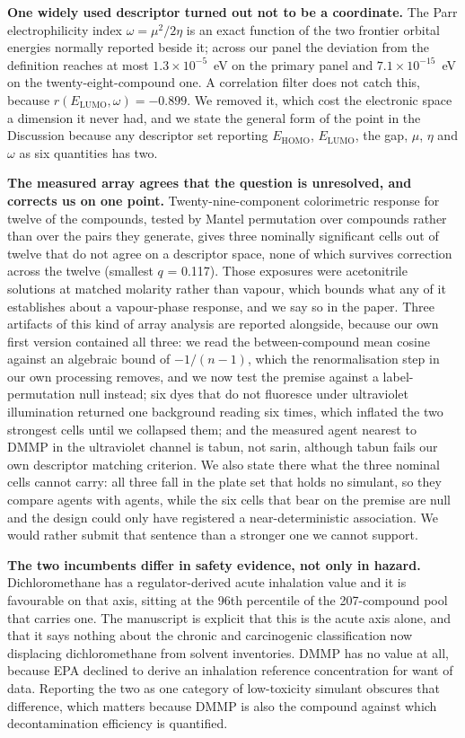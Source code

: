 \documentclass[11pt,a4paper]{article}
\begin{document}
\textbf{One widely used descriptor turned out not to be a coordinate.} The Parr
electrophilicity index $\omega = \mu^{2}/2\eta$ is an exact function of the two
frontier orbital energies normally reported beside it; across our panel the
deviation from the definition reaches at most $1.3\times10^{-5}$~eV on the
primary panel and $7.1\times10^{-15}$~eV on the twenty-eight-compound one. A correlation
filter does not catch this, because $r(E_\mathrm{LUMO}, \omega) = -0.899$. We
removed it, which cost the electronic space a dimension it never had, and we
state the general form of the point in the Discussion because any descriptor set
reporting $E_\mathrm{HOMO}$, $E_\mathrm{LUMO}$, the gap, $\mu$, $\eta$ and
$\omega$ as six quantities has two.

\textbf{The measured array agrees that the question is unresolved, and corrects
us on one point.} Twenty-nine-component colorimetric response for twelve of the
compounds, tested by Mantel permutation over compounds rather than over the
pairs they generate, gives three nominally significant cells out of twelve that
do not agree on a descriptor space, none of which survives correction across
the twelve (smallest $q$ = 0.117). Those exposures were acetonitrile solutions
at matched molarity rather than vapour, which bounds what any of it establishes
about a vapour-phase response, and we say so in the paper. Three artifacts of this kind of array analysis
are reported alongside, because our own first version contained all three:
we read the between-compound mean cosine against an algebraic bound of
$-1/(n-1)$, which the renormalisation step in our own processing removes, and
we now test the premise against a label-permutation null instead; six dyes that do
not fluoresce under ultraviolet illumination returned one background reading six
times, which inflated the two strongest cells until we collapsed them; and the
measured agent nearest to DMMP in the ultraviolet channel is tabun, not sarin,
although tabun fails our own descriptor matching criterion. We also state
there what the three nominal cells cannot carry: all three fall in the plate
set that holds no simulant, so they compare agents with agents, while the six
cells that bear on the premise are null and the design could only have
registered a near-deterministic association. We would rather submit that
sentence than a stronger one we cannot support.

\textbf{The two incumbents differ in safety evidence, not only in hazard.}
Dichloromethane has a regulator-derived acute inhalation value and it is
favourable on that axis, sitting at the 96th percentile of the 207-compound pool
that carries one. The manuscript is explicit that this is the acute axis alone,
and that it says nothing about the chronic and carcinogenic classification
now displacing dichloromethane from solvent inventories. DMMP has no value
at all, because EPA declined to derive an inhalation reference concentration for
want of data. Reporting the two as one category of low-toxicity simulant
obscures that difference, which matters because DMMP is also the compound against
which decontamination efficiency is quantified.
\end{document}
